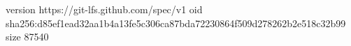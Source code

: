 version https://git-lfs.github.com/spec/v1
oid sha256:d85ef1ead32aa1b4a13fe5c306ca87bda72230864f509d278262b2e518c32b99
size 87540
